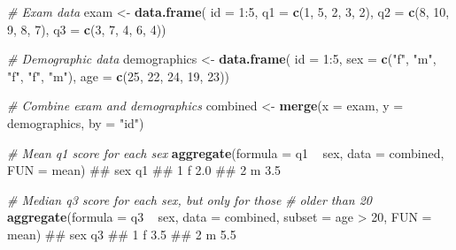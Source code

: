 \documentclass[]{book}
\newenvironment{Shaded}{\begin{snugshade}}{\end{snugshade}}
\newcommand{\KeywordTok}[1]{\textcolor[rgb]{0.13,0.29,0.53}{\textbf{{#1}}}}
\newcommand{\DataTypeTok}[1]{\textcolor[rgb]{0.13,0.29,0.53}{{#1}}}
\newcommand{\DecValTok}[1]{\textcolor[rgb]{0.00,0.00,0.81}{{#1}}}
\newcommand{\StringTok}[1]{\textcolor[rgb]{0.31,0.60,0.02}{{#1}}}
\newcommand{\CommentTok}[1]{\textcolor[rgb]{0.56,0.35,0.01}{\textit{{#1}}}}
\newcommand{\NormalTok}[1]{{#1}}
\theoremstyle{definition}
\theoremstyle{definition}
\theoremstyle{remark}
\begin{document}
\begin{Shaded}
\begin{Highlighting}[]
\CommentTok{# Exam data}
\NormalTok{exam <-}\StringTok{ }\KeywordTok{data.frame}\NormalTok{(}
  \DataTypeTok{id =} \DecValTok{1}\NormalTok{:}\DecValTok{5}\NormalTok{,}
  \DataTypeTok{q1 =} \KeywordTok{c}\NormalTok{(}\DecValTok{1}\NormalTok{, }\DecValTok{5}\NormalTok{, }\DecValTok{2}\NormalTok{, }\DecValTok{3}\NormalTok{, }\DecValTok{2}\NormalTok{),}
  \DataTypeTok{q2 =} \KeywordTok{c}\NormalTok{(}\DecValTok{8}\NormalTok{, }\DecValTok{10}\NormalTok{, }\DecValTok{9}\NormalTok{, }\DecValTok{8}\NormalTok{, }\DecValTok{7}\NormalTok{),}
  \DataTypeTok{q3 =} \KeywordTok{c}\NormalTok{(}\DecValTok{3}\NormalTok{, }\DecValTok{7}\NormalTok{, }\DecValTok{4}\NormalTok{, }\DecValTok{6}\NormalTok{, }\DecValTok{4}\NormalTok{))}

\CommentTok{# Demographic data}
\NormalTok{demographics <-}\StringTok{ }\KeywordTok{data.frame}\NormalTok{(}
  \DataTypeTok{id =} \DecValTok{1}\NormalTok{:}\DecValTok{5}\NormalTok{,}
  \DataTypeTok{sex =} \KeywordTok{c}\NormalTok{(}\StringTok{"f"}\NormalTok{, }\StringTok{"m"}\NormalTok{, }\StringTok{"f"}\NormalTok{, }\StringTok{"f"}\NormalTok{, }\StringTok{"m"}\NormalTok{),}
  \DataTypeTok{age =} \KeywordTok{c}\NormalTok{(}\DecValTok{25}\NormalTok{, }\DecValTok{22}\NormalTok{, }\DecValTok{24}\NormalTok{, }\DecValTok{19}\NormalTok{, }\DecValTok{23}\NormalTok{))}

\CommentTok{# Combine exam and demographics}
\NormalTok{combined <-}\StringTok{ }\KeywordTok{merge}\NormalTok{(}\DataTypeTok{x =} \NormalTok{exam, }
              \DataTypeTok{y =} \NormalTok{demographics, }
              \DataTypeTok{by =} \StringTok{"id"}\NormalTok{)}

\CommentTok{# Mean q1 score for each sex}
\KeywordTok{aggregate}\NormalTok{(}\DataTypeTok{formula =} \NormalTok{q1 ~}\StringTok{ }\NormalTok{sex, }
          \DataTypeTok{data =} \NormalTok{combined, }
          \DataTypeTok{FUN =} \NormalTok{mean)}
\NormalTok{##   sex  q1}
\NormalTok{## 1   f 2.0}
\NormalTok{## 2   m 3.5}

\CommentTok{# Median q3 score for each sex, but only for those}
\CommentTok{#   older than 20}
\KeywordTok{aggregate}\NormalTok{(}\DataTypeTok{formula =} \NormalTok{q3 ~}\StringTok{ }\NormalTok{sex, }
          \DataTypeTok{data =} \NormalTok{combined,}
          \DataTypeTok{subset =} \NormalTok{age >}\StringTok{ }\DecValTok{20}\NormalTok{,}
          \DataTypeTok{FUN =} \NormalTok{mean)}
\NormalTok{##   sex  q3}
\NormalTok{## 1   f 3.5}
\NormalTok{## 2   m 5.5}


\end{Highlighting}
\end{Shaded}
\end{document}

